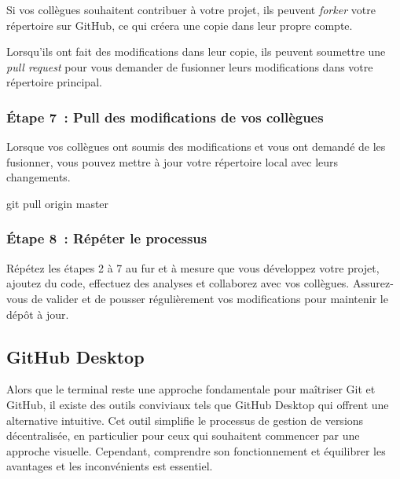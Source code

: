 \documentclass[
  letterpaper,
]{scrbook}
\newenvironment{Shaded}{\begin{snugshade}}{\end{snugshade}}
\newcommand{\FunctionTok}[1]{\textcolor[rgb]{0.28,0.35,0.67}{#1}}
\newcommand{\NormalTok}[1]{\textcolor[rgb]{0.00,0.23,0.31}{#1}}
\begin{document}
Si vos collègues souhaitent contribuer à votre projet, ils peuvent
\emph{forker} votre répertoire sur GitHub, ce qui créera une copie dans
leur propre compte.

Lorsqu'ils ont fait des modifications dans leur copie, ils peuvent
soumettre une \emph{pull request} pour vous demander de fusionner leurs
modifications dans votre répertoire principal.

\hypertarget{uxe9tape-7-pull-des-modifications-de-vos-colluxe8gues}{%
\subsubsection{Étape 7~: Pull des modifications de vos
collègues}\label{uxe9tape-7-pull-des-modifications-de-vos-colluxe8gues}}

Lorsque vos collègues ont soumis des modifications et vous ont demandé
de les fusionner, vous pouvez mettre à jour votre répertoire local avec
leurs changements.

\begin{Shaded}
\begin{Highlighting}[]
\FunctionTok{git}\NormalTok{ pull origin master}
\end{Highlighting}
\end{Shaded}

\hypertarget{uxe9tape-8-ruxe9puxe9ter-le-processus}{%
\subsubsection{Étape 8~: Répéter le
processus}\label{uxe9tape-8-ruxe9puxe9ter-le-processus}}

Répétez les étapes 2 à 7 au fur et à mesure que vous développez votre
projet, ajoutez du code, effectuez des analyses et collaborez avec vos
collègues. Assurez-vous de valider et de pousser régulièrement vos
modifications pour maintenir le dépôt à jour.

\hypertarget{github-desktop}{%
\subsection{GitHub Desktop}\label{github-desktop}}

Alors que le terminal reste une approche fondamentale pour maîtriser Git
et GitHub, il existe des outils conviviaux tels que GitHub Desktop qui
offrent une alternative intuitive. Cet outil simplifie le processus de
gestion de versions décentralisée, en particulier pour ceux qui
souhaitent commencer par une approche visuelle. Cependant, comprendre
son fonctionnement et équilibrer les avantages et les inconvénients est
essentiel.
\end{document}

